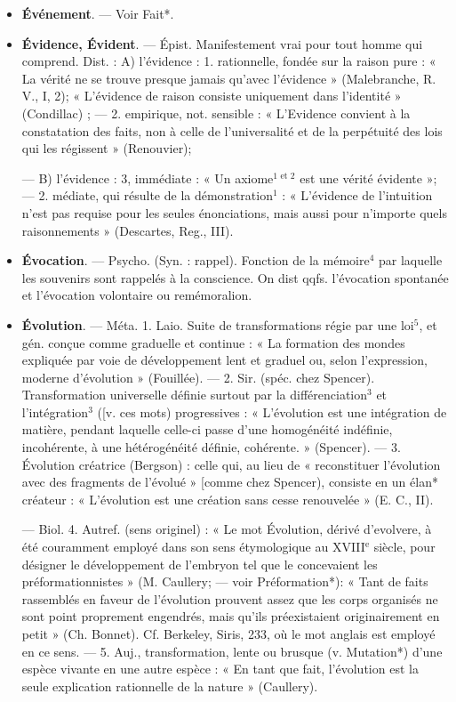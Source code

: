 \begin{itemize}[leftmargin=1cm, label=, itemsep=1pt]
\item {\bf Événement}. — Voir Fait*.

\item {\bf Évidence, Évident}. — Épist. Manifestement vrai pour tout homme qui
comprend. Dist. : A) l'évidence :
1. rationnelle, fondée sur la raison
pure : « La vérité ne se trouve
presque jamais qu'avec l'évidence »
(Malebranche, R. V., I, 2); « L'évidence de raison consiste uniquement dans l'identité » (Condillac) ; —
2. empirique, not. sensible : « L’Evidence convient à la constatation des
faits, non à celle de l’universalité
et de la perpétuité des lois qui les
régissent » (Renouvier);

— B) l'évidence : 3, immédiate :
« Un axiome$^\text{1 et 2}$ est une vérité évidente »; — 2. médiate, qui résulte de
la démonstration$^1$ : « L'évidence de
l'intuition n’est pas requise pour les
seules énonciations, mais aussi pour
n'importe quels raisonnements »
(Descartes, Reg., III).

\item {\bf Évocation}. — Psycho. (Syn. : rappel).
Fonction de la mémoire$^4$ par laquelle
les souvenirs sont rappelés à la conscience. On dist qqfs. l'évocation
spontanée et l’évocation volontaire
ou remémoralion.

\item {\bf Évolution}. — Méta. 1. Laio. Suite de
transformations régie par une loi$^5$,
et gén. conçue comme graduelle et
continue : « La formation des mondes
expliquée par voie de développement lent et graduel ou, selon
l'expression, moderne d'évolution »
(Fouillée). — 2. Sir. (spéc. chez
Spencer). Transformation universelle définie surtout par la différenciation$^3$ et l'intégration$^3$ ([v. ces
mots) progressives : « L’évolution
est une intégration de matière, pendant laquelle celle-ci passe d’une
homogénéité indéfinie, incohérente,
à une hétérogénéité définie, cohérente. » (Spencer). — 3. Évolution
créatrice (Bergson) : celle qui, au
lieu de « reconstituer l’évolution
avec des fragments de l’évolué »
[comme chez Spencer), consiste en
un élan* créateur : « L'évolution
est une création sans cesse renouvelée » (E. C., II).

— Biol. 4. Autref. (sens originel) :
« Le mot Évolution, dérivé d'evolvere, à été couramment employé
dans son sens étymologique au
{\footnotesize XVIII}$^\text{e}$ siècle, pour désigner le développement de l'embryon tel que le
concevaient les préformationnistes »
(M. Caullery; — voir Préformation*):
« Tant de faits rassemblés en faveur
de l’évolution prouvent assez que
les corps organisés ne sont point
proprement engendrés, mais qu'ils
préexistaient  originairement en
petit » (Ch. Bonnet). Cf. Berkeley,
Siris, 233, où le mot anglais est
employé en ce sens. — 5. Auj., transformation, lente ou brusque (v. Mutation*) d’une espèce vivante en une
autre espèce : « En tant que fait,
l’évolution est la seule explication
rationnelle de la nature » (Caullery).


\end{itemize}
